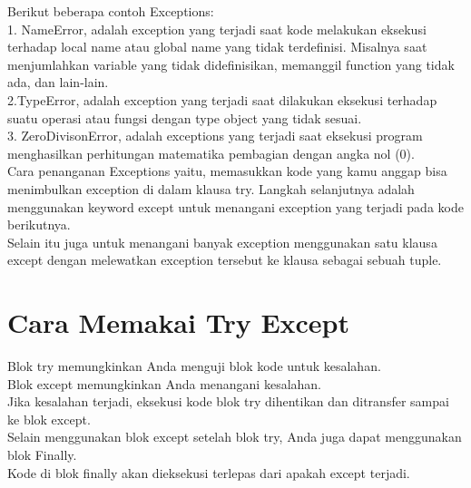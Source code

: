 Berikut beberapa contoh Exceptions:\\
1. NameError, adalah exception yang terjadi saat kode melakukan eksekusi terhadap local name atau global name yang tidak terdefinisi. Misalnya saat menjumlahkan variable yang tidak didefinisikan, memanggil function yang tidak ada, dan lain-lain.\\
2.TypeError, adalah exception yang terjadi saat dilakukan eksekusi terhadap suatu operasi atau fungsi dengan type object yang tidak sesuai.\\
3. ZeroDivisonError, adalah exceptions yang terjadi saat eksekusi program menghasilkan perhitungan matematika pembagian dengan angka nol (0).\\

Cara penanganan Exceptions yaitu, memasukkan kode yang kamu anggap bisa menimbulkan exception di dalam klausa try. Langkah selanjutnya adalah menggunakan keyword except untuk menangani
exception yang terjadi pada kode berikutnya.\\

Selain itu juga untuk menangani banyak exception menggunakan satu klausa except dengan melewatkan exception tersebut ke klausa sebagai sebuah tuple.

\section{Cara Memakai Try Except}

Blok try memungkinkan Anda menguji blok kode untuk kesalahan.\\
Blok except memungkinkan Anda menangani kesalahan.\\

Jika kesalahan terjadi, eksekusi kode blok try dihentikan dan ditransfer sampai ke blok except. \\
Selain menggunakan blok except setelah blok try, Anda juga dapat menggunakan blok Finally. \\
Kode di blok finally akan dieksekusi terlepas dari apakah except terjadi.\\

